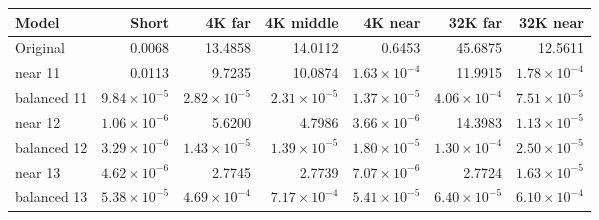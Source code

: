 \begin{tabular}{lrrrrrr}
\toprule
Model & Short & 4K far & 4K middle & 4K near & 32K far & 32K near \\
\midrule
Original & 0.0068 & 13.4858 & 14.0112 & 0.6453 & 45.6875 & 12.5611 \\
near 11 & 0.0113 & 9.7235 & 10.0874 & $1.63\times10^{-4}$ & 11.9915 & $1.78\times10^{-4}$ \\
balanced 11 & $9.84\times10^{-5}$ & $2.82\times10^{-5}$ & $2.31\times10^{-5}$ & $1.37\times10^{-5}$ & $4.06\times10^{-4}$ & $7.51\times10^{-5}$ \\
near 12 & $1.06\times10^{-6}$ & 5.6200 & 4.7986 & $3.66\times10^{-6}$ & 14.3983 & $1.13\times10^{-5}$ \\
balanced 12 & $3.29\times10^{-6}$ & $1.43\times10^{-5}$ & $1.39\times10^{-5}$ & $1.80\times10^{-5}$ & $1.30\times10^{-4}$ & $2.50\times10^{-5}$ \\
near 13 & $4.62\times10^{-6}$ & 2.7745 & 2.7739 & $7.07\times10^{-6}$ & 2.7724 & $1.63\times10^{-5}$ \\
balanced 13 & $5.38\times10^{-5}$ & $4.69\times10^{-4}$ & $7.17\times10^{-4}$ & $5.41\times10^{-5}$ & $6.40\times10^{-5}$ & $6.10\times10^{-4}$ \\
\bottomrule
\end{tabular}
